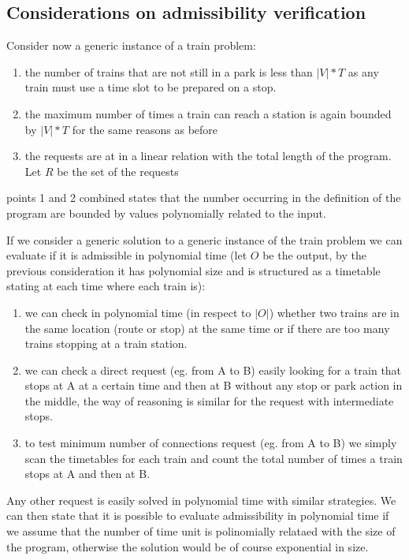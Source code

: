 \documentclass[11pt]{article}
\begin{document}
\subsection{Considerations on admissibility verification }

Consider now a generic instance of a train problem:

\begin{enumerate}
\item the number of trains that are not still in a park is less than $|V|*T$ as any train must use a time slot to be prepared on a stop.
\item the maximum number of times a train can reach a station is again bounded by $|V|*T$ for the same reasons as before
\item the requests are at in a linear relation with the total length of the program. Let $R$ be the set of the requests  
\end{enumerate}

points 1 and 2 combined states that the number occurring in the definition of the program are bounded by values polynomially related to the input. 

If we consider a generic solution to a generic instance of the train problem we can evaluate if it is admissible in
polynomial time (let $O$ be the output, by the previous consideration it has polynomial size and is structured as a timetable stating at each time where each train is):
\begin{enumerate}
\item we can check in polynomial time (in respect to $|O|$) whether two trains are in the same location (route or stop) at the same time or if there are too many trains stopping at a train station. 
\item we can check a direct request (eg. from A to B) easily looking for a train that stops at A at a certain time and then at B without any stop or park action in the middle, the way of reasoning is similar for the request with intermediate stops.
\item to test minimum number of connections request (eg. from A to B) we simply scan the timetables for each train and count the total number of times a train stops at A and then at B. 
\end{enumerate}


Any other request is easily solved in polynomial time with similar strategies. We can then state that it is possible to evaluate admissibility in polynomial time if we assume that
the number of time unit is polinomially relataed with the size of the program, 
otherwise the solution would be of course exponential in size.
\end{document}
